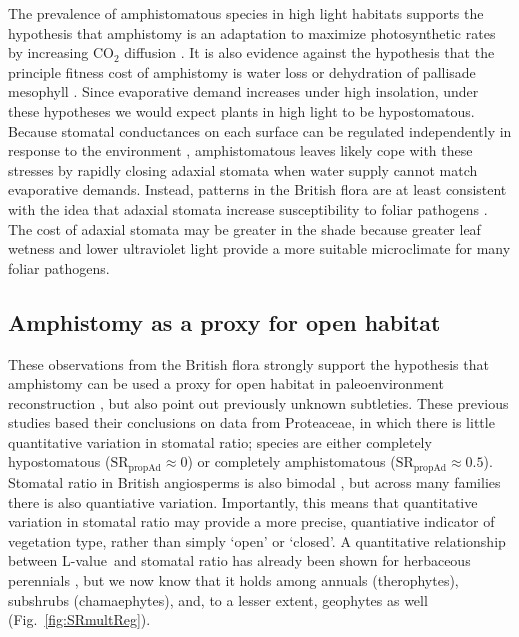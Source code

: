 \documentclass[12pt, oneside]{article}
\newcommand{\el}{L-value}
\begin{document}
The prevalence of amphistomatous species in high light habitats supports the hypothesis that amphistomy is an adaptation to maximize photosynthetic rates by increasing CO$_2$ diffusion \citep{Jones_1985}. It is also evidence against the hypothesis that the principle fitness cost of amphistomy is water loss \citep{Darwin_1886, Foster_Smith_1986} or dehydration of pallisade mesophyll \citep{Buckley_etal_2015}. Since evaporative demand increases under high insolation, under these hypotheses we would expect plants in high light to be hypostomatous. Because stomatal conductances on each surface can be regulated independently in response to the environment \citep{Darwin_1898, Pospisilova_Solarova_1980, Smith_1981, Reich_1984, Mott_Oleary_1984}, amphistomatous leaves likely cope with these stresses by rapidly closing adaxial stomata when water supply cannot match evaporative demands. Instead, patterns in the British flora are at least consistent with the idea that adaxial stomata increase susceptibility to foliar pathogens \citep{Gutschick_1984b, Mckown_etal_2014}. The cost of adaxial stomata may be greater in the shade because greater leaf wetness and lower ultraviolet light provide a more suitable microclimate for many foliar pathogens.

\subsection*{Amphistomy as a proxy for open habitat}

These observations from the British flora strongly support the hypothesis that amphistomy can be used a proxy for open habitat in paleoenvironment reconstruction \citep{Carpenter_1994, Jordan_etal_2014, Carpenter_etal_2015}, but also point out previously unknown subtleties. These previous studies based their conclusions on data from Proteaceae, in which there is little quantitative variation in stomatal ratio; species are either completely hypostomatous ($\mathrm{SR_{propAd}} \approx 0$) or completely amphistomatous ($\mathrm{SR_{propAd}} \approx 0.5$). Stomatal ratio in British angiosperms is also bimodal \citep{Peat_Fitter_1994b}, but across many families there is also quantiative variation. Importantly, this means that quantitative variation in stomatal ratio may provide a more precise, quantiative indicator of vegetation type, rather than simply `open' or `closed'. A quantitative relationship between \el~and stomatal ratio has already been shown for herbaceous perennials \citep{Bucher_etal_2017}, but we now know that it holds among annuals (therophytes), subshrubs (chamaephytes), and, to a lesser extent, geophytes as well (Fig.~\ref{fig:SRmultReg}). 
\end{document}

